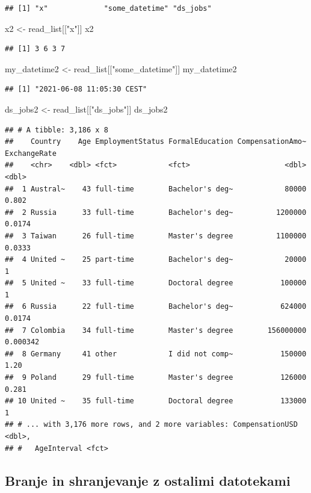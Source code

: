 \documentclass[
]{book}
\newenvironment{Shaded}{\begin{snugshade}}{\end{snugshade}}
\newcommand{\NormalTok}[1]{#1}
\newcommand{\OtherTok}[1]{\textcolor[rgb]{0.56,0.35,0.01}{#1}}
\newcommand{\StringTok}[1]{\textcolor[rgb]{0.31,0.60,0.02}{#1}}
\begin{document}
\begin{verbatim}
## [1] "x"             "some_datetime" "ds_jobs"
\end{verbatim}

\begin{Shaded}
\begin{Highlighting}[]
\NormalTok{x2 }\OtherTok{\textless{}{-}}\NormalTok{ read\_list[[}\StringTok{"x"}\NormalTok{]]}
\NormalTok{x2}
\end{Highlighting}
\end{Shaded}

\begin{verbatim}
## [1] 3 6 3 7
\end{verbatim}

\begin{Shaded}
\begin{Highlighting}[]
\NormalTok{my\_datetime2 }\OtherTok{\textless{}{-}}\NormalTok{ read\_list[[}\StringTok{"some\_datetime"}\NormalTok{]]}
\NormalTok{my\_datetime2}
\end{Highlighting}
\end{Shaded}

\begin{verbatim}
## [1] "2021-06-08 11:05:30 CEST"
\end{verbatim}

\begin{Shaded}
\begin{Highlighting}[]
\NormalTok{ds\_jobs2 }\OtherTok{\textless{}{-}}\NormalTok{ read\_list[[}\StringTok{"ds\_jobs"}\NormalTok{]]}
\NormalTok{ds\_jobs2}
\end{Highlighting}
\end{Shaded}

\begin{verbatim}
## # A tibble: 3,186 x 8
##    Country    Age EmploymentStatus FormalEducation CompensationAmo~ ExchangeRate
##    <chr>    <dbl> <fct>            <fct>                      <dbl>        <dbl>
##  1 Austral~    43 full-time        Bachelor's deg~            80000     0.802   
##  2 Russia      33 full-time        Bachelor's deg~          1200000     0.0174  
##  3 Taiwan      26 full-time        Master's degree          1100000     0.0333  
##  4 United ~    25 part-time        Bachelor's deg~            20000     1       
##  5 United ~    33 full-time        Doctoral degree           100000     1       
##  6 Russia      22 full-time        Bachelor's deg~           624000     0.0174  
##  7 Colombia    34 full-time        Master's degree        156000000     0.000342
##  8 Germany     41 other            I did not comp~           150000     1.20    
##  9 Poland      29 full-time        Master's degree           126000     0.281   
## 10 United ~    35 full-time        Doctoral degree           133000     1       
## # ... with 3,176 more rows, and 2 more variables: CompensationUSD <dbl>,
## #   AgeInterval <fct>
\end{verbatim}

\hypertarget{branje-in-shranjevanje-z-ostalimi-datotekami}{%
\subsection{Branje in shranjevanje z ostalimi datotekami}\label{branje-in-shranjevanje-z-ostalimi-datotekami}}

  
\end{document}
